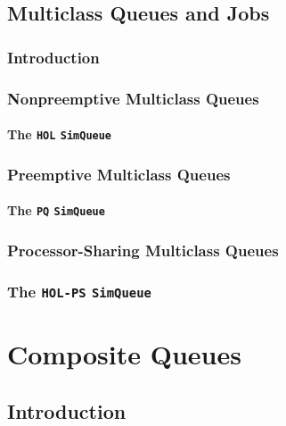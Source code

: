 \documentclass[12pt]{book}
\begin{document}
\section{Multiclass Queues and Jobs}
\label{sec:multiclass}

\subsection{Introduction}
\label{sec:multiclass-introduction}

\subsection{Nonpreemptive Multiclass Queues}
\label{sec:multiclass-nonpreemptive}

\subsubsection{The \lstinline{HOL} \lstinline{SimQueue}}
\label{sec:HOL}

\subsection{Preemptive Multiclass Queues}
\label{sec:multiclass-preemptive}

\subsubsection{The \lstinline{PQ} \lstinline{SimQueue}}
\label{sec:PQ}

\subsection{Processor-Sharing Multiclass Queues}
\label{sec:multiclass-processorsharing}

\subsection{The \lstinline{HOL-PS} \lstinline{SimQueue}}
\label{sec:HOL-PS}

\chapter{Composite Queues}
\label{sec:composite}

\section{Introduction}
\end{document}
